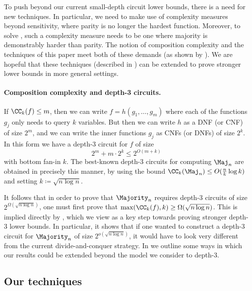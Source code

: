 To push beyond our current small-depth circuit lower bounds, there is a need for new techniques.
In particular, we need to make use of complexity measures beyond sensitivity, where parity is no longer the hardest function.
Moreover, to solve , such a complexity measure needs to be one where majority is demonstrably harder than parity.
The notion of composition complexity and the techniques of this paper meet both of these demands (as shown by ).
We are hopeful that these techniques (described in ) can be extended to prove stronger lower bounds in more general settings.


\paragraph*{Composition complexity and depth-3 circuits.} If $\CC_k(f) \leq m$, then we can write $f=  h(g_1, \ldots, g_m)$ where each of the functions $g_j$ only needs to query $k$ variables.
But then  we can write $h$ as a DNF (or CNF) of size $2^m$, and we can write the inner functions $g_j$ as CNFs (or DNFs) of size $2^k$.
In this form we have a depth-3 circuit for $f$ of size
\begin{equation}
\label{eq:cc-to-depth3}
2^m + m\cdot 2^k
\leq 
2^{O(m + k)}
\end{equation}
with bottom fan-in $k$.
The best-known depth-3 circuits for computing $\Maj_n$ are obtained in precisely this manner,
by using the bound
$\CC_k(\Maj_n) \leq O(\frac{n}{k} \log k)$ and setting $k \coloneqq \sqrt{n\log n}$.

It follows that in order to prove that $\Majority_n$ requires depth-3 circuits of size $2^{\Omega(\sqrt{n \log n})}$, one must first prove that $\max(\CC_k(f), k) \geq \Omega(\sqrt{n \log n})$.
This is implied directly by , which we view as a key  step towards proving stronger depth-3 lower bounds. In particular, it shows that if one wanted to construct a depth-3 circuit for $\Majority_n$ of size $2^{o(\sqrt{n \log n})}$, it would have to look very different from the current divide-and-conquer strategy.
In  we outline some ways in which our results could be extended beyond the model we consider to depth-3.






\subsection{Our techniques}\label{sec:techniques}

